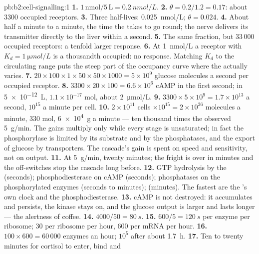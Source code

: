 \begin{solution}{pb:b2:cell-signalling:1}
\textbf{1.} $1\,\text{nmol}/5\,\text{L} = \qty{0.2}{nmol/L}$.
\textbf{2.} $\theta = 0.2/1.2 = 0.17$: about 3300 occupied receptors.
\textbf{3.} Three half-lives: \qty{0.025}{nmol/L}; $\theta = 0.024$.
\textbf{4.} About half a minute to a minute, the time the 
takes to go round; the nerve delivers its transmitter directly to
the liver within a second.
\textbf{5.} The same fraction, but $33\,000$ occupied receptors: a
tenfold larger response.
\textbf{6.} At \qty{1}{nmol/L} a receptor with $K_d = \qty{1}{\micro
mol/L}$ is a thousandth occupied: no response. Matching $K_d$ to the
circulating range puts the steep part of the occupancy curve where
the  actually varies.
\textbf{7.} $20\times 100\times 1\times 50\times 50\times 1000 =
5\times 10^{9}$ glucose molecules a second per occupied receptor.
\textbf{8.} $3300\times 20\times 100 = 6.6\times 10^{6}$ cAMP in the
first second; in \qty{5e-12}{L}, $1.1\times 10^{-17}$ mol, about
\qty{2}{\micro mol/L}.
\textbf{9.} $3300\times 5\times 10^{9} = 1.7\times 10^{13}$ a second, $10^{15}$
a minute per cell.
\textbf{10.} $2\times 10^{11}$ cells $\times 10^{15} = 2\times
10^{26}$ molecules a minute, 330 mol, \qty{6e4}{g} a minute --- ten
thousand times the observed \qty{5}{g/min}. The gains multiply only
while every stage is unsaturated; in fact the phosphorylase is
limited by its substrate and by the phosphatases, and the export of
glucose by transporters. The cascade's gain is spent on speed and
sensitivity, not on output.
\textbf{11.} At \qty{5}{g/min}, twenty minutes; the fright is over in
minutes and the off-switches stop the cascade long before.
\textbf{12.} GTP hydrolysis by the  (seconds);
phosphodiesterase on cAMP (seconds); phosphatases on the
phosphorylated enzymes (seconds to minutes);  (minutes). The fastest are the 's own clock
and the phosphodiesterase.
\textbf{13.} cAMP is not destroyed: it accumulates and persists, the
kinase stays on, and the glucose output is larger and lasts longer
--- the alertness of coffee.
\textbf{14.} $4000/50 = \qty{80}{s}$.
\textbf{15.} $600/5 = \qty{120}{s}$ per enzyme per ribosome; 30 per
ribosome per hour, 600 per mRNA per hour.
\textbf{16.} $100\times 600 = 60\,000$ enzymes an hour; $10^{5}$ after
about \qty{1.7}{h}.
\textbf{17.} Ten to twenty minutes for cortisol to enter, bind and

\end{solution}

